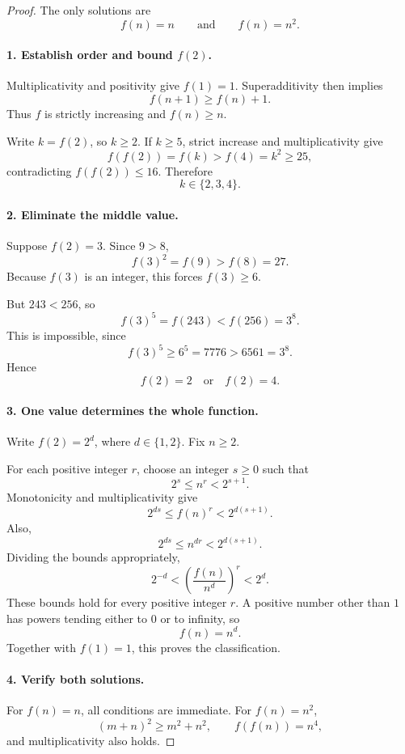 
\begin{dlsummary}[title={\bfseries Solution 46. The Missing Middle Value},breakable]

\begin{proof}
The only solutions are
\[
\boxed{f(n)=n\qquad\text{and}\qquad f(n)=n^2.}
\]

\paragraph{1. Establish order and bound \(f(2)\).}

Multiplicativity and positivity give \(f(1)=1\). Superadditivity then implies
\[
f(n+1)\ge f(n)+1.
\]
Thus \(f\) is strictly increasing and \(f(n)\ge n\).

Write \(k=f(2)\), so \(k\ge2\). If \(k\ge5\), strict increase and multiplicativity give
\[
f(f(2))=f(k)>f(4)=k^2\ge25,
\]
contradicting \(f(f(2))\le16\). Therefore
\[
\boxed{k\in\{2,3,4\}.}
\]

\paragraph{2. Eliminate the middle value.}

Suppose \(f(2)=3\). Since \(9>8\),
\[
f(3)^2=f(9)>f(8)=27.
\]
Because \(f(3)\) is an integer, this forces \(f(3)\ge6\).

But \(243<256\), so
\[
f(3)^5=f(243)<f(256)=3^8.
\]
This is impossible, since
\[
f(3)^5\ge6^5=7776>6561=3^8.
\]
Hence
\[
f(2)=2\quad\text{or}\quad f(2)=4.
\]

\paragraph{3. One value determines the whole function.}

Write \(f(2)=2^d\), where \(d\in\{1,2\}\). Fix \(n\ge2\).

For each positive integer \(r\), choose an integer \(s\ge0\) such that
\[
2^s\le n^r<2^{s+1}.
\]
Monotonicity and multiplicativity give
\[
2^{ds}\le f(n)^r<2^{d(s+1)}.
\]
Also,
\[
2^{ds}\le n^{dr}<2^{d(s+1)}.
\]
Dividing the bounds appropriately,
\[
2^{-d}<\left(\frac{f(n)}{n^d}\right)^r<2^d.
\]
These bounds hold for every positive integer \(r\). A positive number other than \(1\) has powers tending either to \(0\) or to infinity, so
\[
f(n)=n^d.
\]
Together with \(f(1)=1\), this proves the classification.

\paragraph{4. Verify both solutions.}

For \(f(n)=n\), all conditions are immediate. For \(f(n)=n^2\),
\[
(m+n)^2\ge m^2+n^2,
\qquad
f(f(n))=n^4,
\]
and multiplicativity also holds.
\end{proof}
\end{dlsummary}

